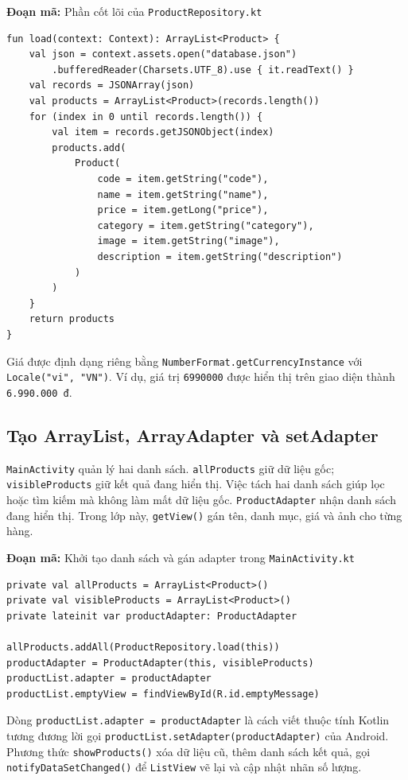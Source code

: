 \documentclass[12pt,a4paper]{article}
\newcommand{\codepath}[1]{\nolinkurl{#1}}
\newcommand{\codecaption}[1]{\par\noindent\textbf{Đoạn mã:} #1\par\vspace{3pt}}
\begin{document}
\codecaption{Phần cốt lõi của \codepath{ProductRepository.kt}}
\begin{Verbatim}[fontsize=\small,breaklines=true,frame=single]
fun load(context: Context): ArrayList<Product> {
    val json = context.assets.open("database.json")
        .bufferedReader(Charsets.UTF_8).use { it.readText() }
    val records = JSONArray(json)
    val products = ArrayList<Product>(records.length())
    for (index in 0 until records.length()) {
        val item = records.getJSONObject(index)
        products.add(
            Product(
                code = item.getString("code"),
                name = item.getString("name"),
                price = item.getLong("price"),
                category = item.getString("category"),
                image = item.getString("image"),
                description = item.getString("description")
            )
        )
    }
    return products
}
\end{Verbatim}

\noindent Giá được định dạng riêng bằng \texttt{NumberFormat.getCurrencyInstance}
với \texttt{Locale("vi", "VN")}. Ví dụ, giá trị \texttt{6990000} được hiển thị
trên giao diện thành \texttt{6.990.000 đ}.

\subsection{Tạo ArrayList, ArrayAdapter và setAdapter}
\texttt{MainActivity} quản lý hai danh sách. \texttt{allProducts} giữ dữ liệu gốc;
\texttt{visibleProducts} giữ kết quả đang hiển thị. Việc tách hai danh sách
giúp lọc hoặc tìm kiếm mà không làm mất dữ liệu gốc. \texttt{ProductAdapter}
nhận danh sách đang hiển thị. Trong lớp này, \texttt{getView()} gán tên,
danh mục, giá và ảnh cho từng hàng.

\codecaption{Khởi tạo danh sách và gán adapter trong \codepath{MainActivity.kt}}
\begin{Verbatim}[fontsize=\small,breaklines=true,frame=single]
private val allProducts = ArrayList<Product>()
private val visibleProducts = ArrayList<Product>()
private lateinit var productAdapter: ProductAdapter

allProducts.addAll(ProductRepository.load(this))
productAdapter = ProductAdapter(this, visibleProducts)
productList.adapter = productAdapter
productList.emptyView = findViewById(R.id.emptyMessage)
\end{Verbatim}

\noindent Dòng \texttt{productList.adapter = productAdapter} là cách viết thuộc tính
Kotlin tương đương lời gọi \texttt{productList.setAdapter(productAdapter)} của Android.
Phương thức \texttt{showProducts()} xóa dữ liệu cũ, thêm danh sách kết quả, gọi
\texttt{notifyDataSetChanged()} để \texttt{ListView} vẽ lại và cập nhật nhãn số lượng.
\end{document}
